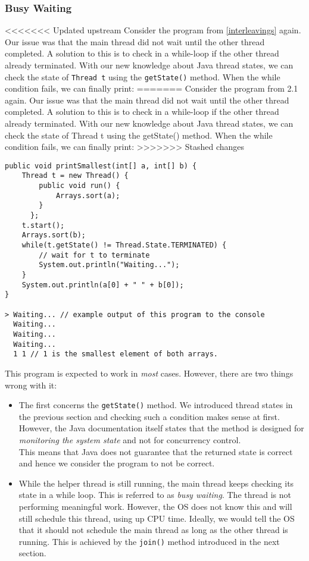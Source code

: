 \documentclass[main.tex]{subfiles}
\begin{document}
\subsubsection{Busy Waiting}
<<<<<<< Updated upstream
Consider the program from \ref{interleavings} again. Our issue was that the main thread did not wait until the other thread completed. A solution to this is to check in a while-loop if the other thread already terminated. With our new knowledge about Java thread states, we can check the state of \texttt{Thread t} using the \texttt{getState()} method. When the while condition fails, we can finally print:
=======
Consider the program from 2.1 again. Our issue was that the main thread did not wait until the other thread completed. A solution to this is to check in a while-loop if the other thread already terminated. With our new knowledge about Java thread states, we can check the state of Thread t using the getState() method. When the while condition fails, we can finally print:
>>>>>>> Stashed changes
\begin{verbatim}
public void printSmallest(int[] a, int[] b) {
    Thread t = new Thread() {
        public void run() {
            Arrays.sort(a);
        }
      };
    t.start();
    Arrays.sort(b);
    while(t.getState() != Thread.State.TERMINATED) {
        // wait for t to terminate
        System.out.println("Waiting...");
    }
    System.out.println(a[0] + " " + b[0]);
}

> Waiting... // example output of this program to the console
  Waiting...
  Waiting...
  Waiting...
  1 1 // 1 is the smallest element of both arrays.
\end{verbatim}
This program is expected to work in \textit{most} cases. However, there are two things wrong with it:
\begin{itemize}
    \item The first concerns the \texttt{getState()} method. We introduced thread states in the previous section and checking such a condition makes sense at first. However, the Java documentation itself states that the method is designed for \textit{monitoring the system state} and not for concurrency control.\\
          This means that Java does not guarantee that the returned state is correct and hence we consider the program to not be correct. %
    \item While the helper thread is still running, the main thread keeps checking its state in a while loop. This is referred to as \textit{busy waiting}. The thread is not performing meaningful work. However, the OS does not know this and will still schedule this thread, using up CPU time. Ideally, we would tell the OS that it should not schedule the main thread as long as the other thread is running. This is achieved by the \texttt{join()} method introduced in the next section.
\end{itemize}
\end{document}
